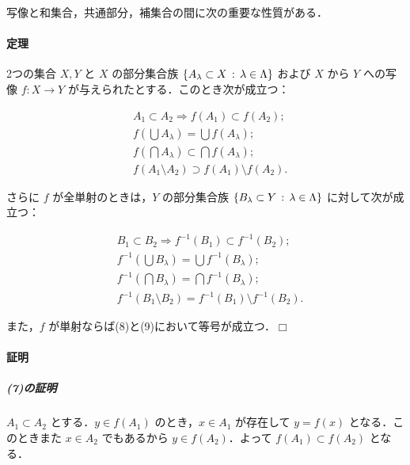 \documentclass[pandoc,base=10pt,b5j,precisetext]{bxjsarticle}
\let\oldparagraph\paragraph
\renewcommand{\paragraph}[1]{\oldparagraph{#1}\mbox{}}
\let\oldsubparagraph\subparagraph
\renewcommand{\subparagraph}[1]{\oldsubparagraph{#1}\mbox{}}
\begin{document}
写像と和集合，共通部分，補集合の間に次の重要な性質がある．

\hypertarget{ux5b9aux7406}{%
\paragraph{定理}\label{ux5b9aux7406}}

2つの集合 \(X, Y\) と \(X\) の部分集合族
\(\{A_\lambda \subset X \,:\, \lambda \in \Lambda \}\) および \(X\) から
\(Y\) への写像 \(f \colon X \to Y\)
が与えられたとする．このとき次が成立つ：

\begin{align}
&A_1 \subset A_2 \Longrightarrow f(A_1) \subset f(A_2);\\
&f(\bigcup A_\lambda) = \bigcup f(A_\lambda);\\
&f(\bigcap A_\lambda) \subset \bigcap f(A_\lambda);\\
&f(A_1 \setminus A_2) \supset f(A_1) \setminus f(A_2).
\end{align}

さらに \(f\) が全単射のときは，\(Y\) の部分集合族
\(\{B_\lambda \subset Y \,:\, \lambda \in \Lambda \}\)
に対して次が成立つ：

\begin{align}
&B_1 \subset B_2 \Longrightarrow f^{-1}(B_1) \subset f^{-1}(B_2);\\
&f^{-1}(\bigcup B_\lambda) = \bigcup f^{-1}(B_\lambda);\\
&f^{-1}(\bigcap B_\lambda) = \bigcap f^{-1}(B_\lambda);\\
&f^{-1}(B_1 \setminus B_2) = f^{-1}(B_1) \setminus f^{-1}(B_2).
\end{align}

また，\(f\) が単射ならば(8)と(9)において等号が成立つ．\(\Box\)

\hypertarget{ux8a3cux660e-1}{%
\paragraph{証明}\label{ux8a3cux660e-1}}

\hypertarget{ux306eux8a3cux660e-3}{%
\subparagraph{(7)の証明}\label{ux306eux8a3cux660e-3}}

\(A_1 \subset A_2\) とする．\(y \in f(A_1)\) のとき，\(x \in A_1\)
が存在して \(y = f(x)\) となる．このときまた \(x \in A_2\) でもあるから
\(y \in f(A_2)\)．よって \(f(A_1) \subset f(A_2)\) となる．
\end{document}
